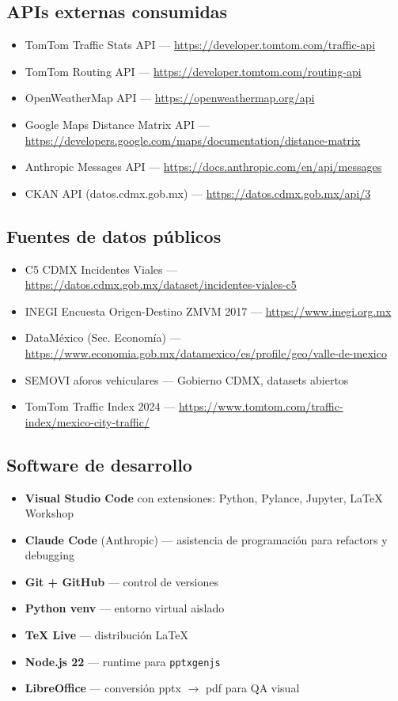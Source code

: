 \documentclass[11pt,a4paper]{article}
\begin{document}
\subsection{APIs externas consumidas}
\begin{itemize}
  \item TomTom Traffic Stats API --- \url{https://developer.tomtom.com/traffic-api}
  \item TomTom Routing API --- \url{https://developer.tomtom.com/routing-api}
  \item OpenWeatherMap API --- \url{https://openweathermap.org/api}
  \item Google Maps Distance Matrix API --- \url{https://developers.google.com/maps/documentation/distance-matrix}
  \item Anthropic Messages API --- \url{https://docs.anthropic.com/en/api/messages}
  \item CKAN API (datos.cdmx.gob.mx) --- \url{https://datos.cdmx.gob.mx/api/3}
\end{itemize}

\subsection{Fuentes de datos públicos}
\begin{itemize}
  \item C5 CDMX Incidentes Viales --- \url{https://datos.cdmx.gob.mx/dataset/incidentes-viales-c5}
  \item INEGI Encuesta Origen-Destino ZMVM 2017 --- \url{https://www.inegi.org.mx}
  \item DataMéxico (Sec. Economía) --- \url{https://www.economia.gob.mx/datamexico/es/profile/geo/valle-de-mexico}
  \item SEMOVI aforos vehiculares --- Gobierno CDMX, datasets abiertos
  \item TomTom Traffic Index 2024 --- \url{https://www.tomtom.com/traffic-index/mexico-city-traffic/}
\end{itemize}

\subsection{Software de desarrollo}
\begin{itemize}
  \item \textbf{Visual Studio Code} con extensiones: Python, Pylance, Jupyter, LaTeX Workshop
  \item \textbf{Claude Code} (Anthropic) --- asistencia de programación para refactors y debugging
  \item \textbf{Git + GitHub} --- control de versiones
  \item \textbf{Python venv} --- entorno virtual aislado
  \item \textbf{TeX Live} --- distribución \LaTeX
  \item \textbf{Node.js 22} --- runtime para \texttt{pptxgenjs}
  \item \textbf{LibreOffice} --- conversión pptx $\rightarrow$ pdf para QA visual
\end{itemize}
\end{document}
